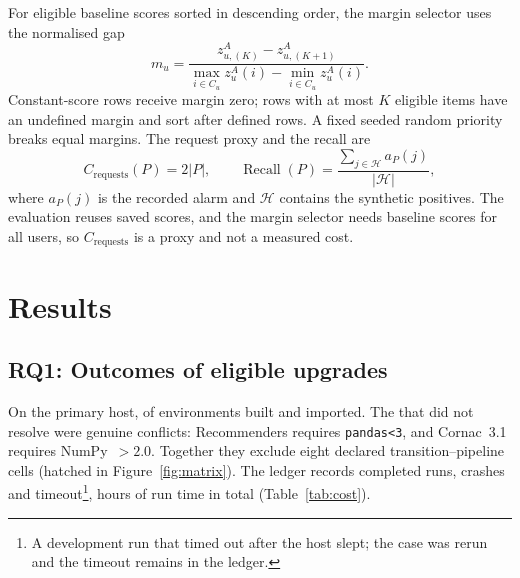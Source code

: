\documentclass[11pt,a4paper]{article}
\begin{document}
For eligible baseline scores sorted in descending order, the margin selector
uses the normalised gap
\begin{equation}
 m_u=\frac{z^A_{u,(K)}-z^A_{u,(K+1)}}
              {\max_{i\in C_u}z^A_u(i)-\min_{i\in C_u}z^A_u(i)}.
 \label{eq:margin}
\end{equation}
Constant-score rows receive margin zero; rows with at most $K$ eligible items
have an undefined margin and sort after defined rows. A fixed seeded random
priority breaks equal margins. The request proxy and the recall are
\begin{equation}
 C_{\mathrm{requests}}(P)=2|P|,\qquad
 \operatorname{Recall}(P)=\frac{\sum_{j\in\mathcal H}a_P(j)}{|\mathcal H|},
 \label{eq:recall}
\end{equation}
where $a_P(j)$ is the recorded alarm and $\mathcal H$ contains the synthetic
positives. The evaluation reuses saved scores, and the margin selector needs
baseline scores for all users, so $C_{\mathrm{requests}}$ is a proxy and not a
measured cost.

\section{Results}
\label{sec:results}

\subsection{RQ1: Outcomes of eligible upgrades}

On the primary host, \nEnvsOk{} of \nEnvs{} environments built and imported. The
\nEnvsResolveFailed{} that did not resolve were genuine conflicts: Recommenders
requires \texttt{pandas<3}, and Cornac~3.1 requires NumPy~$>2.0$. Together they
exclude eight declared transition--pipeline cells (hatched in
Figure~\ref{fig:matrix}). The ledger records \nRunsOk{} completed runs,
\nRunsCrash{} crashes and \nRunsTimeout{} timeout\footnote{A development run
that timed out after the host slept; the case was rerun and the timeout
remains in the ledger.}, \computeHours{} hours of run time in total
(Table~\ref{tab:cost}).
\end{document}
